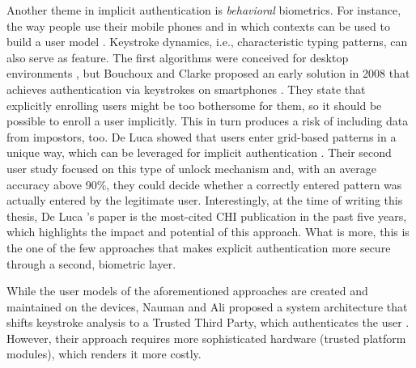 	
	Another theme in implicit authentication is \textit{behavioral} biometrics. For instance, the way people use their mobile phones and in which contexts can be used to build a user model \cite{Jakobsson2009ImplicitAuthentication}. Keystroke dynamics, i.e., characteristic typing patterns, can also serve as feature. The first algorithms were conceived for desktop environments \cite{Crawford2010KeystrokeDynamics}, but Bouchoux and Clarke proposed an early solution in 2008 that achieves authentication via keystrokes on smartphones \cite{Buchoux2008KeystrokeAnalysis}. They state that explicitly enrolling users might be too bothersome for them, so it should be possible to enroll a user implicitly. This in turn produces a risk of including data from impostors, too. De Luca showed that users enter grid-based patterns in a unique way, which can be leveraged for implicit authentication \cite{DeLuca2012TouchMeOnce}. Their second user study focused on this type of unlock mechanism and, with an average accuracy above 90\%, they could decide whether a correctly entered pattern was actually entered by the legitimate user. Interestingly, at the time of writing this thesis, De Luca \etal's paper is the most-cited CHI publication in the past five  years, which highlights the impact and potential of this approach. What is more, this is the one of the few approaches that makes explicit authentication more secure through a second, biometric layer.
	
	While the user models of the aforementioned approaches are created and maintained on the devices, Nauman and Ali proposed a system architecture that shifts keystroke analysis to a Trusted Third Party, which authenticates the user \cite{Nauman2010TOKEN}. However, their approach requires more sophisticated hardware (trusted platform modules), which renders it more costly.

